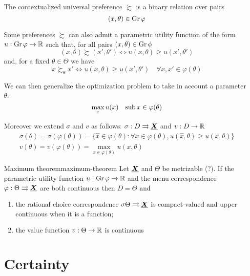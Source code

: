\documentclass[12pt]{extarticle}
\renewcommand{\vec}[1]{\uvec{#1}}
\newcommand{\Gr}{{\operatorfont Gr} \,}
\begin{document}
The contextualized universal preference $\succsim$ is a binary relation over pairs
\begin{equation}
    (x, \theta) \in \Gr \varphi
\end{equation}

Some preferences $\succsim$ can also admit a parametric utility function of the form $u : \Gr \varphi \to \R$ such that, for all pairs $(x, \theta) \in \Gr \phi$
\begin{equation}
    (x, \theta) \succsim (x', \theta') \iff u(x, \theta) \geq u(x', \theta')
\end{equation}
and, for a fixed $\theta \in \Theta$ we have
\begin{equation}
    x \succsim_\theta x' \iff u(x,\theta) \geq u(x', \theta') \quad \forall x,x' \in \varphi(\theta)
\end{equation}

We can then generalize the optimization problem to take in account a parameter $\theta$:
\begin{equation}
    \max_x u(x) \quad {\operatorfont sub} \, x \in \varphi (\theta)
\end{equation}

Moreover we extend $\sigma$ and $v$ as follows:
$\sigma : D \rightrightarrows \vec X$ and $v: D \to \mathbb{R}$
\begin{gather}
    \sigma(\theta) = \sigma(\varphi(\theta)) = \{ \hat x \in \varphi(\theta) : \forall x \in \varphi(\theta), u(\hat x, \theta) \geq u(x, \theta)\} \\
    v(\theta) = v(\varphi(\theta)) = \max_{x \in \varphi (\theta)} u(x, \theta)
\end{gather}

\begin{theorem}{Maximum theorem}{maximum-theorem}
    Let $\vec X$ and $\Theta$ be metrizable (?).
    If the parametric utility function $u: \Gr \varphi \to \R$ and the menu correspondence $\varphi: \Theta \rightrightarrows \vec X$ are both continuous then $D = \Theta$ and
    \begin{enumerate}[label=\roman*.]
        \item the rational choice correspondence $\sigma \Theta \rightrightarrows \vec X$ is compact-valued and upper continuous when it is a function;
        \item the value function $v: \Theta \to \mathbb{R}$ is continuous
    \end{enumerate}
\end{theorem}

\section{Certainty}
\end{document}
